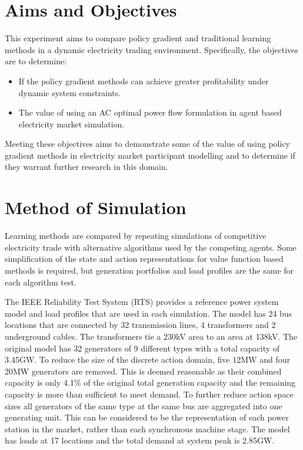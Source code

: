 \section{Aims and Objectives}
This experiment aims to compare policy gradient and traditional learning methods
in a dynamic electricity trading environment.  Specifically, the objectives are
to determine:
\begin{itemize}
  \item If the policy gradient methods can achieve greater profitability
  under dynamic system constraints.
  \item The value of using an AC optimal power flow formulation in agent based
  electricity market simulation.
\end{itemize}
Meeting these objectives aims to demonstrate some of the value of using policy
gradient methods in electricity market participant modelling and to determine
if they warrant further research in this domain.

\section{Method of Simulation}
Learning methods are compared by repeating simulations of
competitive electricity trade with alternative algorithms used by the competing
agents. Some simplification of the state and action representations for value
function based methods is required, but generation portfolios and load profiles
are the same for each algorithm test.

The IEEE Reliability Test System (RTS) provides a reference power system model
and load profiles that are used in each simulation.  The model has 24 bus
locations that are connected by 32 transmission lines, 4 transformers and 2 underground cables. The
transformers tie a 230kV area to an area at 138kV.  The original model has 32
generators of 9 different types with a total capacity of 3.45GW.  To reduce the
size of the discrete action domain, five 12MW and four 20MW generators are
removed.  This is deemed reasonable as their combined capacity is only 4.1\% of
the original total generation capacity and the remaining capacity is more than
sufficient to meet demand.  To further reduce action space sizes all generators
of the same type at the same bus are aggregated into one generating unit.
This can be considered to be the representation of each power station in the
market, rather than each synchronous machine stage.  The model has
loads at 17 locations and the total demand at system peak is 2.85GW.

